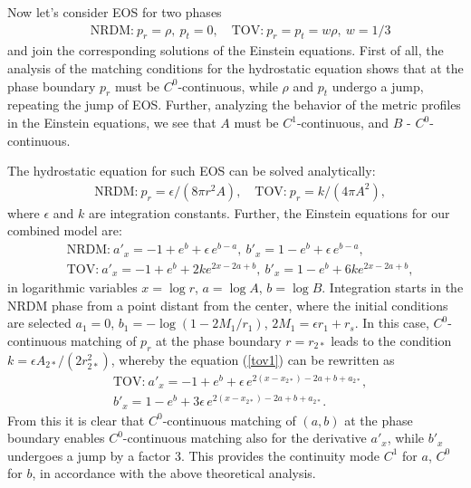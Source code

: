 \documentclass{article}
\begin{document}
Now let's consider EOS for two phases
\begin{eqnarray}
&\textrm{NRDM:}\ p_r=\rho,\ p_t=0,\quad \textrm{TOV:}\ p_r=p_t=w\rho,\ w=1/3
\end{eqnarray}
and join the corresponding solutions of the Einstein equations. First of all, the analysis of the matching conditions for the hydrostatic equation shows that at the phase boundary $ p_r $ must be $ C ^ 0 $-continuous, while $ \rho $ and $ p_t $ undergo a jump, repeating the jump of EOS. Further, analyzing the behavior of the metric profiles in the Einstein equations, we see that $ A $ must be $ C ^ 1 $-continuous, and $ B $ - $ C ^ 0 $-continuous.

The hydrostatic equation for such EOS can be solved analytically: 
\begin{eqnarray}
&\textrm{NRDM:}\ p_r=\epsilon/(8\pi r^2A),\quad \textrm{TOV:}\ p_r=k/(4\pi A^2), \label{hydreqsol}
\end{eqnarray}
where $ \epsilon $ and $ k $ are integration constants. Further, the Einstein equations for our combined model are: 
\begin{eqnarray}
&\textrm{NRDM:}\ a'_x=-1+e^b+\epsilon\, e^{b-a},\ b'_x=1-e^b+\epsilon\, e^{b-a},\\
&\textrm{TOV:}\ a'_x=-1 + e^b + 2k e^{2 x -2a + b},\ b'_x= 1 - e^b + 6k e^{2 x -2a + b},
\label{tov1}
\end{eqnarray}
in logarithmic variables $ x = \log r $, $ a = \log A $, $ b = \log B $. Integration starts in the NRDM phase from a point distant from the center, where the initial conditions are selected $ a_1 = 0 $, $ b_1 = - \log (1-2M_1 / r_1) $, $ 2M_1 = \epsilon r_1 + r_s $. In this case, $ C ^ 0 $-continuous matching of $ p_r $ at the phase boundary $ r = r_ {2 *} $ leads to the condition $ k = \epsilon A_ {2 *} / (2r_ {2 *} ^ 2) $, whereby the equation (\ref {tov1}) can be rewritten as
\begin{eqnarray}
&\textrm{TOV:}\ a'_x=-1 + e^b + \epsilon\, e^{2 (x-x_{2*}) -2a + b +a_{2*}},\\
&b'_x= 1 - e^b + 3\epsilon\, e^{2 (x-x_{2*}) -2a + b +a_{2*}}.
\end{eqnarray}
From this it is clear that $ C ^ 0 $-continuous matching of $ (a, b) $ at the phase boundary enables $ C ^ 0 $-continuous matching also for the derivative $ a'_x $, while $ b'_x $ undergoes a jump by a factor 3. This provides the continuity mode $ C ^ 1 $ for $ a $, $ C ^ 0 $ for $ b $, in accordance with the above theoretical analysis. 
\end{document}
